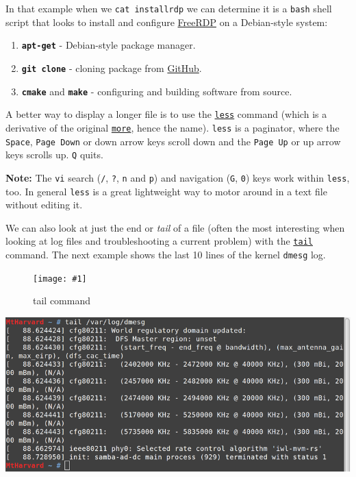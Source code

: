 \documentclass[10pt,]{book}
\numberwithin{figure}{chapter}
\DeclareRobustCommand{\fimg}[3]{
\ifxetex
\begin{figure}[H]
\texttt{[image: \#1]}
\caption{#2}
\label{fig:#3}
\end{figure}
\fi}
\DeclareRobustCommand{\fref}[1]{\ifxetex{(Figure \ref{fig:#1})}\fi}
\begin{document}
In that example when we \texttt{cat installrdp} we can determine it is a
\texttt{bash} shell script that looks to install and configure
\href{https://github.com/FreeRDP/FreeRDP}{FreeRDP} on a Debian-style
system:

\begin{enumerate}
\def\labelenumi{\arabic{enumi}.}
\item
  \textbf{\texttt{apt-get}} - Debian-style package manager.
\item
  \textbf{\texttt{git clone}} - cloning package from
  \href{http://github.com}{GitHub}.
\item
  \textbf{\texttt{cmake}} and \textbf{\texttt{make}} - configuring and
  building software from source.
\end{enumerate}

A better way to display a longer file is to use the
\href{http://linux.die.net/man/1/less}{\texttt{less}} command (which is
a derivative of the original
\href{http://linux.die.net/man/1/more}{\texttt{more}}, hence the name).
\texttt{less} is a paginator, where the \texttt{Space},
\texttt{Page Down} or down arrow keys scroll down and the
\texttt{Page Up} or up arrow keys scrolls up. \texttt{Q} quits.

\textbf{Note:} The \texttt{vi} search (\texttt{/}, \texttt{?},
\texttt{n} and \texttt{p}) and navigation (\texttt{G}, \texttt{0}) keys
work within \texttt{less}, too. In general \texttt{less} is a great
lightweight way to motor around in a text file without editing it.

We can also look at just the end or \emph{tail} of a file (often the
most interesting when looking at log files and troubleshooting a current
problem) with the \href{http://linux.die.net/man/1/tail}{\texttt{tail}}
command. The next example \fref{tail-dmesg} shows the last 10 lines of
the kernel \texttt{dmesg} log.

\ifxetex\fimg{./images/tail-dmesg.png}{tail command}{tail-dmesg} \else
\includegraphics{./images/tail-dmesg.png} \fi
\end{document}
